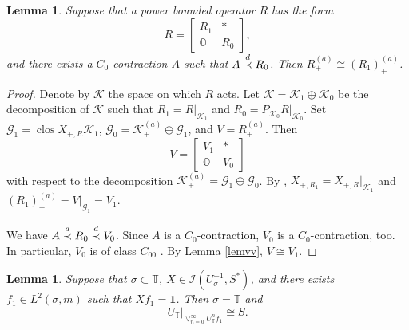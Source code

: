 \documentclass[a4paper,oneside,11pt]{amsart}
\numberwithin{equation}{section}
\theoremstyle{plain}
\newtheorem{lemma}[theorem]{Lemma}
\theoremstyle{definition}
\begin{document}
\begin{lemma}\label{lemasymp1} Suppose that a power bounded operator $R$ has the form 
\begin{equation*} R=\left[\begin{matrix}R_1 & * \\ \mathbb O & R_0\end{matrix}\right],\end{equation*}
and there exists a $C_0$-contraction $A$ such that $A\buildrel d\over\prec R_0$.
Then $R_+^{(a)}\cong (R_1)_+^{(a)}$.
\end{lemma}
\begin{proof} Denote by $\mathcal K$ the space on which $R$ acts. Let 
$\mathcal K=\mathcal K_1\oplus\mathcal K_0$ be the  decomposition of $\mathcal K$ such that 
$R_1=R|_{\mathcal K_1}$ and $R_0=P_{\mathcal K_0}R|_{\mathcal K_0}$.  
Set $\mathcal G_1=\operatorname{clos}X_{+,R}\mathcal K_1$, 
$\mathcal G_0= \mathcal K_+^{(a)}\ominus\mathcal G_1$, and  $V=R_+^{(a)}$. 
Then
\begin{equation*} V=\left[\begin{matrix}V_1 & * \\ \mathbb O & V_0\end{matrix}\right]
\end{equation*}
  with respect to the decomposition 
$\mathcal K_+^{(a)}=\mathcal G_1\oplus\mathcal G_0$. By \cite{ker89}, 
 $X_{+, R_1}=X_{+, R}|_{\mathcal K_1}$ and $(R_1)_+^{(a)}=V|_{\mathcal G_1}=V_1$.
 
We have $A\buildrel d\over\prec R_0\buildrel d\over\prec V_0$. Since $A$ is a $C_0$-contraction, $V_0$ is a $C_0$-contraction, too. 
In particular, $V_0$ is of class $C_{00}$ {\cite[Prop. III.4.2]{nfbk}}. By Lemma \ref{lemvv}, $V\cong V_1$.
\end{proof}

\begin{lemma} \label{lem11}Suppose that $\sigma\subset\mathbb T$, $X\in\mathcal I(U_\sigma^{-1}, S^*)$, and there exists 
 $f_1\in L^2(\sigma,m)$   such that $Xf_1=\mathbf{1}$.
 Then $\sigma=\mathbb T$ 
and \begin{equation*} U_{\mathbb T}|_{\vee_{n=0}^\infty U_{\mathbb T}^n f_1}\cong S.\end{equation*}
\end{lemma}
\end{document}
